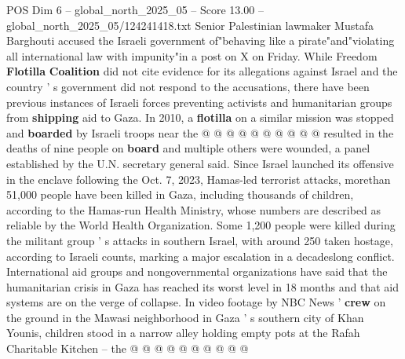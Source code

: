 \begin{textsample}{POS Dim 6 – global\_north\_2025\_05 – Score 13.00 – global\_north\_2025\_05/124241418.txt}
Senior Palestinian lawmaker Mustafa Barghouti accused the Israeli government of"behaving like a pirate"and"violating all international law with impunity"in a post on X on Friday.
While Freedom \textbf{Flotilla} \textbf{Coalition} did not cite evidence for its allegations against Israel and the country ' s government did not respond to the accusations, there have been previous instances of Israeli forces preventing activists and humanitarian groups from \textbf{shipping} aid to Gaza.
In 2010, a \textbf{flotilla} on a similar mission was stopped and \textbf{boarded} by Israeli troops near the @ @ @ @ @ @ @ @ @ @ resulted in the deaths of nine people on \textbf{board} and multiple others were wounded, a panel established by the U.N. secretary general said.
Since Israel launched its offensive in the enclave following the Oct. 7, 2023, Hamas-led terrorist attacks, morethan 51,000 people have been killed in Gaza, including thousands of children, according to the Hamas-run Health Ministry, whose numbers are described as reliable by the World Health Organization.
Some 1,200 people were killed during the militant group ' s attacks in southern Israel, with around 250 taken hostage, according to Israeli counts, marking a major escalation in a decadeslong conflict.
International aid groups and nongovernmental organizations have said that the humanitarian crisis in Gaza has reached its worst level in 18 months and that aid systems are on the verge of collapse.
In video footage by NBC News ' \textbf{crew} on the ground in the Mawasi neighborhood in Gaza ' s southern city of Khan Younis, children stood in a narrow alley holding empty pots at the Rafah Charitable Kitchen -- the @ @ @ @ @ @ @ @ @ @

\end{textsample}
